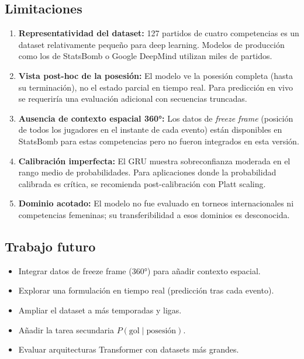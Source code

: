 \documentclass[12pt,a4paper]{article}
\begin{document}
\subsection{Limitaciones}

\begin{enumerate}[leftmargin=1.5em]
    \item \textbf{Representatividad del dataset:} 127 partidos de cuatro competencias
          es un dataset relativamente pequeño para deep learning. Modelos de producción
          como los de StatsBomb o Google DeepMind utilizan miles de partidos.
    \item \textbf{Vista post-hoc de la posesión:} El modelo ve la posesión completa
          (hasta su terminación), no el estado parcial en tiempo real. Para predicción
          en vivo se requeriría una evaluación adicional con secuencias truncadas.
    \item \textbf{Ausencia de contexto espacial 360°:} Los datos de \textit{freeze frame}
          (posición de todos los jugadores en el instante de cada evento) están disponibles
          en StatsBomb para estas competencias pero no fueron integrados en esta versión.
    \item \textbf{Calibración imperfecta:} El GRU muestra sobreconfianza moderada
          en el rango medio de probabilidades. Para aplicaciones donde la probabilidad
          calibrada es crítica, se recomienda post-calibración con Platt scaling.
    \item \textbf{Dominio acotado:} El modelo no fue evaluado en torneos internacionales
          ni competencias femeninas; su transferibilidad a esos dominios es desconocida.
\end{enumerate}

\subsection{Trabajo futuro}

\begin{itemize}[leftmargin=1.5em, noitemsep]
    \item Integrar datos de freeze frame (360°) para añadir contexto espacial.
    \item Explorar una formulación en tiempo real (predicción tras cada evento).
    \item Ampliar el dataset a más temporadas y ligas.
    \item Añadir la tarea secundaria $P(\text{gol} \mid \text{posesión})$.
    \item Evaluar arquitecturas Transformer con datasets más grandes.
\end{itemize}
\end{document}

